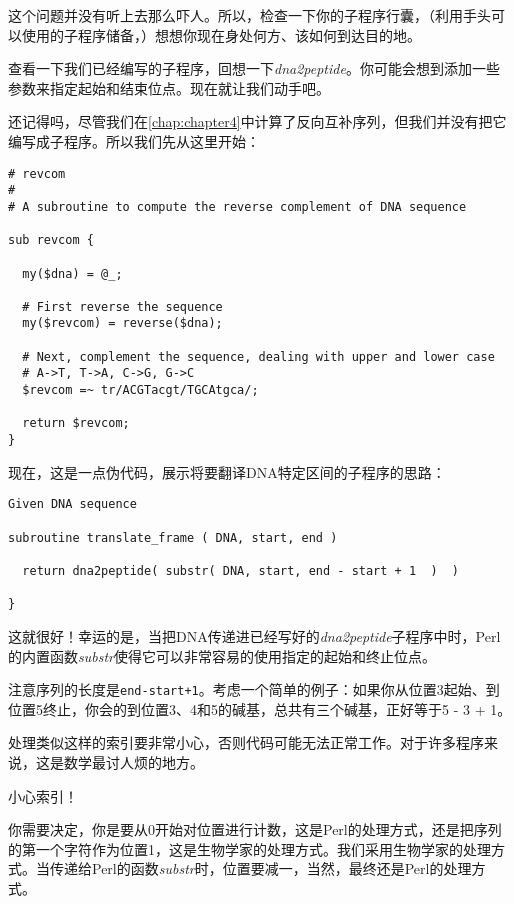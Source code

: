 这个问题并没有听上去那么吓人。所以，检查一下你的子程序行囊，（利用手头可以使用的子程序储备，）想想你现在身处何方、该如何到达目的地。

查看一下我们已经编写的子程序，回想一下\textit{dna2peptide}。你可能会想到添加一些参数来指定起始和结束位点。现在就让我们动手吧。

还记得吗，尽管我们在\autoref{chap:chapter4}中计算了反向互补序列，但我们并没有把它编写成子程序。所以我们先从这里开始：

\begin{lstlisting}
# revcom 
#
# A subroutine to compute the reverse complement of DNA sequence

sub revcom {

  my($dna) = @_;

  # First reverse the sequence
  my($revcom) = reverse($dna);

  # Next, complement the sequence, dealing with upper and lower case
  # A->T, T->A, C->G, G->C
  $revcom =~ tr/ACGTacgt/TGCAtgca/;

  return $revcom;
}
\end{lstlisting}

现在，这是一点伪代码，展示将要翻译DNA特定区间的子程序的思路：

\begin{lstlisting}
Given DNA sequence

subroutine translate_frame ( DNA, start, end )

  return dna2peptide( substr( DNA, start, end - start + 1  )  )

}
\end{lstlisting}

这就很好！幸运的是，当把DNA传递进已经写好的\textit{dna2peptide}子程序中时，Perl的内置函数\textit{substr}使得它可以非常容易的使用指定的起始和终止位点。

注意序列的长度是\verb|end-start+1|。考虑一个简单的例子：如果你从位置3起始、到位置5终止，你会的到位置3、4和5的碱基，总共有三个碱基，正好等于5 - 3 + 1。

处理类似这样的索引要非常小心，否则代码可能无法正常工作。对于许多程序来说，这是数学最讨人烦的地方。


\begin{adjustwidth}{2cm}{2cm}
小心索引！
\end{adjustwidth}

你需要决定，你是要从0开始对位置进行计数，这是Perl的处理方式，还是把序列的第一个字符作为位置1，这是生物学家的处理方式。我们采用生物学家的处理方式。当传递给Perl的函数\textit{substr}时，位置要减一，当然，最终还是Perl的处理方式。

